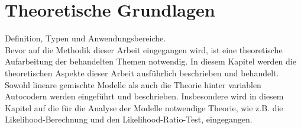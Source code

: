 \documentclass[%
thesis=student,%
coverpage=false,%
titlepage=false,%
headmarks=true, %
german,%
font=libertine, %
math=newpxtx, %
BCOR=5mm,%
coverBCOR=11mm%
]{tumbook}
\theoremstyle{break}
\begin{document}
\chapter{Theoretische Grundlagen}
Definition, Typen und Anwendungsbereiche.\\
Bevor auf die Methodik dieser Arbeit eingegangen wird, ist eine theoretische Aufarbeitung der behandelten Themen notwendig. In diesem Kapitel werden die theoretischen Aspekte dieser Arbeit ausführlich beschrieben und behandelt. Sowohl lineare gemischte Modelle als auch die Theorie hinter variablen Autocodern werden eingeführt und beschrieben. Insbesondere wird in diesem Kapitel auf die für die Analyse der Modelle notwendige Theorie, wie z.B. die Likelihood-Berechnung und den Likelihood-Ratio-Test, eingegangen.
\end{document}
